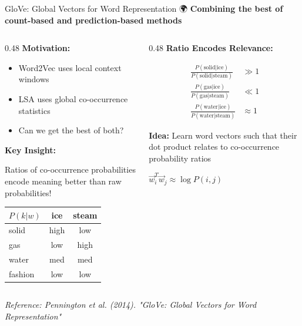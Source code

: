 \documentclass[aspectratio=169]{beamer}
\begin{document}
\begin{frame}{GloVe: Global Vectors for Word Representation 🌍}
\textbf{Combining the best of count-based and prediction-based methods}

\vspace{1em}

\begin{columns}[T]
\begin{column}{0.48\textwidth}
\textbf{Motivation:}
\begin{itemize}\setlength{\itemsep}{0pt}
    \item Word2Vec uses \alert{local} context windows
    \item LSA uses \alert{global} co-occurrence statistics
    \item Can we get the best of both?
\end{itemize}

\vspace{0.5em}
\textbf{Key Insight:}

Ratios of co-occurrence probabilities encode meaning better than raw probabilities!

\vspace{0.5em}
\begin{center}
\small
\begin{tabular}{lcc}
\toprule
$P(k|w)$ & ice & steam \\
\midrule
solid & high & low \\
gas & low & high \\
water & med & med \\
fashion & low & low \\
\bottomrule
\end{tabular}
\end{center}
\end{column}

\begin{column}{0.48\textwidth}
\textbf{Ratio Encodes Relevance:}

\vspace{0.5em}
\begin{align*}
\frac{P(\text{solid}|\text{ice})}{P(\text{solid}|\text{steam})} &\gg 1 \\
\frac{P(\text{gas}|\text{ice})}{P(\text{gas}|\text{steam})} &\ll 1 \\
\frac{P(\text{water}|\text{ice})}{P(\text{water}|\text{steam})} &\approx 1
\end{align*}

\vspace{0.5em}
\textbf{Idea:}
Learn word vectors such that their dot product relates to co-occurrence probability ratios

\vspace{0.5em}
$\vec{w}_i^T \vec{w}_j \approx \log P(i,j)$
\end{column}
\end{columns}

\vspace{0.5em}
\small
\textit{Reference: Pennington et al. (2014). "GloVe: Global Vectors for Word Representation"}
\end{frame}
\end{document}
